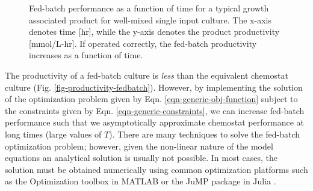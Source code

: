 \documentclass[11pt]{article}
\theoremstyle{definition}
\begin{document}
\begin{figure*}[!ht]\centering
{}
\caption{Fed-batch performance as a function of time for a typical growth associated product for well-mixed single input culture.
The x-axis denotes time [hr], while the y-axis denotes the product productivity [mmol/L-hr]. If operated correctly, the
fed-batch productivity increases as a function of time.}\label{fig-productivity-fedbatch}
\end{figure*}

The productivity of a fed-batch culture is \textit{less} than the equivalent chemostat culture (Fig. \eqref{fig-productivity-fedbatch}).
However, by implementing the solution of the optimization problem given by Eqn. \eqref{eqn-generic-obj-function} subject to the constraints given by Eqn. \eqref{eqn-generic-constraints},
we can increase fed-batch performance such that we asymptotically approximate chemostat performance at long times (large values of $T$).
There are many techniques to solve the fed-batch optimization problem; however, given the non-linear nature of the model equations an analytical solution is usually not possible.
In most cases, the solution must be obtained numerically using common optimization platforms such as the Optimization toolbox in MATLAB or the JuMP package in Julia \citep{julia_jump}.


\end{document}
